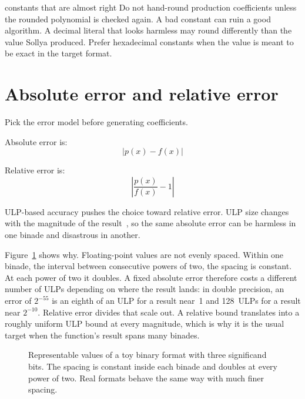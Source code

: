 \documentclass[manuscript, nonacm]{acmart}
\begin{document}
  \begin{pitfall}{constants that are almost right}
    Do not hand-round production coefficients unless the rounded polynomial is
    checked again. A bad constant can ruin a good algorithm. A decimal
    literal that looks harmless may round differently than the value Sollya
    produced. Prefer hexadecimal constants when the value is meant to be
    exact in the target format.
  \end{pitfall}



  \section{Absolute error and relative error}
  \label{sec:relabs}

  Pick the error model before generating coefficients.

  Absolute error is:
  \[ |p(x) - f(x)| \]

  Relative error is:
  \[ \left|\frac{p(x)}{f(x)} - 1\right| \]

  ULP-based accuracy pushes the choice toward relative error. ULP size changes
  with the magnitude of the result~\cite{handbook}, so the same absolute error
  can be harmless in one binade and disastrous in another.

  Figure~\ref{fig:ulpspacing} shows why. Floating-point values are not
  evenly spaced. Within one binade, the interval between consecutive powers
  of two, the spacing is constant. At each power of two it doubles. A
  fixed absolute error therefore costs a different number of ULPs depending
  on where the result lands: in double precision, an error of $2^{-55}$ is
  an eighth of an ULP for a result near~1 and 128~ULPs for a result near
  $2^{-10}$. Relative
  error divides that scale out. A relative bound translates into a roughly
  uniform ULP bound at every magnitude, which is why it is the usual target
  when the function's result spans many binades.

  \begin{figure}[tbp]
    \centering
    \caption{Representable values of a toy binary format with three
    significand bits. The spacing is constant inside each binade and
    doubles at every power of two. Real formats behave the same way with
    much finer spacing.}
    \label{fig:ulpspacing}
  \end{figure}
\end{document}
